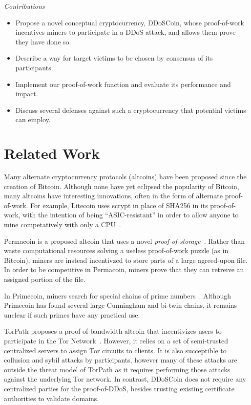 \emph{Contributions}
\begin{itemize}
\item Propose a novel conceptual cryptocurrency, DDoSCoin, whose proof-of-work
incentives miners to participate in a DDoS attack, and allows them prove they have done so.
\item Describe a way for target victims to be chosen by consensus of its
participants.
\item Implement our proof-of-work function and evaluate its performance and
impact.
\item Discuss several defenses against such a cryptocurrency that potential
victims can employ.
\end{itemize}


\section{Related Work}

Many alternate cryptocurrency protocols (altcoins) have been proposed since the
creation of Bitcoin. Although none have yet eclipsed the popularity of Bitcoin,
many altcoins have interesting innovations, often in the form of alternate
proof-of-work. For example, Litecoin uses scrypt in place of SHA256 in its
proof-of-work, with the intention of being ``ASIC-resistant'' in order to allow
anyone to mine competatively with only a CPU~\cite{litecoin}.

Permacoin is a proposed altcoin that uses a novel
\emph{proof-of-storage}~\cite{permacoin}.  Rather than waste computational
resources solving a useless proof-of-work puzzle (as in Bitcoin), miners are
instead incentivzed to store parts of a large agreed-upon file. In order to be
competitive in Permacoin, miners prove that they can retreive an assigned
portion of the file.

In Primecoin, miners search for special chains of prime
numbers~\cite{primecoin}. Although Primecoin has found several large Cunningham
and bi-twin chains, it remains unclear if such primes have any practical use.

TorPath proposes a proof-of-bandwidth altcoin that incentivizes users to
participate in the Tor Network~\cite{torpath}. However, it relies on a set of
semi-trusted centralized servers to assign Tor circuits to clients. It is also
succeptible to collusion and sybil attacks by participants, however many of
these attacks are outside the threat model of TorPath as it requires performing
those attacks against the underlying Tor network. In contrast, DDoSCoin does not
require any centralized parties for the proof-of-DDoS, besides trusting existing
certificate authorities to validate domains.

